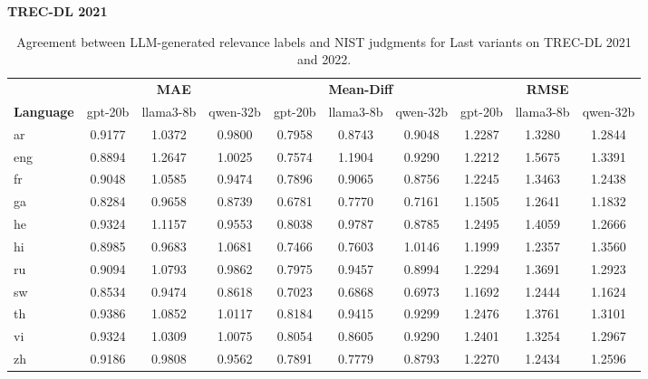 \begin{table}[t]
\centering
\caption{Agreement between LLM-generated relevance labels and NIST judgments for Last variants on TREC-DL 2021 and 2022.}
\label{tab:metrics_last}
\setlength{\tabcolsep}{3.5pt}
\footnotesize
\textbf{TREC-DL 2021} \\
\vspace{0.2em}
\begin{tabular}{lccccccccc}
\toprule
 & \multicolumn{3}{c}{\textbf{MAE}} & \multicolumn{3}{c}{\textbf{Mean-Diff}} & \multicolumn{3}{c}{\textbf{RMSE}} \\
\cmidrule(lr){2-4} \cmidrule(lr){5-7} \cmidrule(lr){8-10}
\textbf{Language} & gpt-20b & llama3-8b & qwen-32b & gpt-20b & llama3-8b & qwen-32b & gpt-20b & llama3-8b & qwen-32b \\
\midrule
ar & 0.9177 & 1.0372 & 0.9800 & 0.7958 & 0.8743 & 0.9048 & 1.2287 & 1.3280 & 1.2844 \\
eng & 0.8894 & 1.2647 & 1.0025 & 0.7574 & 1.1904 & 0.9290 & 1.2212 & 1.5675 & 1.3391 \\
fr & 0.9048 & 1.0585 & 0.9474 & 0.7896 & 0.9065 & 0.8756 & 1.2245 & 1.3463 & 1.2438 \\
ga & 0.8284 & 0.9658 & 0.8739 & 0.6781 & 0.7770 & 0.7161 & 1.1505 & 1.2641 & 1.1832 \\
he & 0.9324 & 1.1157 & 0.9553 & 0.8038 & 0.9787 & 0.8785 & 1.2495 & 1.4059 & 1.2666 \\
hi & 0.8985 & 0.9683 & 1.0681 & 0.7466 & 0.7603 & 1.0146 & 1.1999 & 1.2357 & 1.3560 \\
ru & 0.9094 & 1.0793 & 0.9862 & 0.7975 & 0.9457 & 0.8994 & 1.2294 & 1.3691 & 1.2923 \\
sw & 0.8534 & 0.9474 & 0.8618 & 0.7023 & 0.6868 & 0.6973 & 1.1692 & 1.2444 & 1.1624 \\
th & 0.9386 & 1.0852 & 1.0117 & 0.8184 & 0.9415 & 0.9299 & 1.2476 & 1.3761 & 1.3101 \\
vi & 0.9324 & 1.0309 & 1.0075 & 0.8054 & 0.8605 & 0.9290 & 1.2401 & 1.3254 & 1.2967 \\
zh & 0.9186 & 0.9808 & 0.9562 & 0.7891 & 0.7779 & 0.8793 & 1.2270 & 1.2434 & 1.2596 \\
\bottomrule
\end{tabular}
\vspace{2em}


\end{table}
